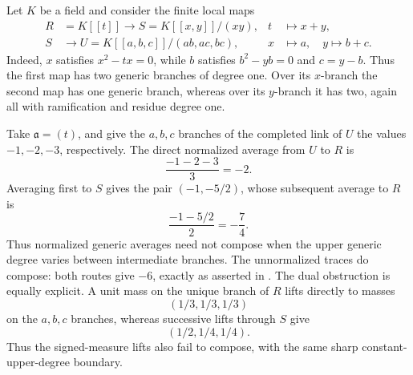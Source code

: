 \begin{example}
\label{ex:p126-curve-variable-degree-average}
Let \(K\) be a field and consider the finite local maps
\[
 \begin{aligned}
 R&=K[[t]]\longrightarrow
 S=K[[x,y]]/(xy),& t&\longmapsto x+y,\\
 S&\longrightarrow
 U=K[[a,b,c]]/(ab,ac,bc),& x&\longmapsto a,\quad
 y\longmapsto b+c.
 \end{aligned}
\]
Indeed, \(x\) satisfies \(x^2-tx=0\), while \(b\) satisfies
\(b^2-yb=0\) and \(c=y-b\).  Thus the first map has two generic branches
of degree one.  Over its \(x\)-branch the second map has one generic branch,
whereas over its \(y\)-branch it has two, again all with ramification and
residue degree one.

Take \(\mathfrak a=(t)\), and give the \(a,b,c\) branches of the completed
link of \(U\) the values \(-1,-2,-3\), respectively.  The direct normalized
average from \(U\) to \(R\) is
\[
                          \frac{-1-2-3}{3}=-2.
\]
Averaging first to \(S\) gives the pair \((-1,-5/2)\), whose subsequent
average to \(R\) is
\[
                          \frac{-1-5/2}{2}=-\frac74.
\]
Thus normalized generic averages need not compose when the upper generic
degree varies between intermediate branches.  The unnormalized traces do
compose: both routes give \(-6\), exactly as asserted in
.  The dual obstruction is
equally explicit.  A unit mass on the unique branch of \(R\) lifts directly
to masses
\[
                         (1/3,1/3,1/3)
\]
on the \(a,b,c\) branches, whereas successive lifts through \(S\) give
\[
                         (1/2,1/4,1/4).
\]
Thus the signed-measure lifts also fail to compose, with the same sharp
constant-upper-degree boundary.
\end{example}

